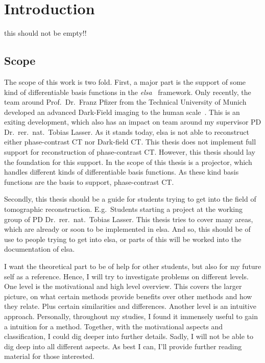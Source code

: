 \chapter{Introduction}\label{chap:introduction}

this should not be empty!!

\section{Scope}\label{chap:scope}

The scope of this work is two fold. First, a major part is the support of some kind of
differentiable basis functions in the \textit{elsa}~\cite{lasser_elsa_2019} framework. Only
recently, the team around Prof.\ Dr.\ Franz Pfizer from the Technical University of Munich developed
an advanced Dark-Field imaging to the human scale~\cite{viermetz_dark-field_2022}. This is an
exiting development, which also has an impact on team around my supervisor PD Dr.\ rer.\ nat.\
Tobias Lasser. As it stands today, elsa is not able to reconstruct either phase-contrast CT nor Dark-field
CT\@. This thesis does not implement full support for reconstruction of phase-contrast CT\@.
However, this thesis should lay the foundation for this support. In the scope of this thesis is a
projector, which handles different kinds of differentiable basis functions. As these kind basis
functions are the basis to support, phase-contrast CT\@.

Secondly, this thesis should be a guide for students trying to get into the field of tomographic
reconstruction. E.g.\ Students starting a project at the working group of PD Dr.\ rer.\ nat.\ Tobias
Lasser. This thesis tries to cover many areas, which are already or soon to be implemented in elsa.
And so, this should be of use to people trying to get into elsa, or parts of this will be worked
into the documentation of elsa.

I want the theoretical part to be of help for other students, but also for my future self as a
reference. Hence, I will try to investigate problems on different levels. One level is the
motivational and high level overview. This covers the larger picture, on what certain methods
provide benefits over other methods and how they relate. Plus certain similarities and differences.
Another level is an intuitive approach. Personally, throughout my studies, I found it immensely
useful to gain a intuition for a method. Together, with the motivational aspects and classification,
I could dig deeper into further details. Sadly, I will not be able to dig deep into all different
aspects. As best I can, I'll provide further reading material for those interested.


